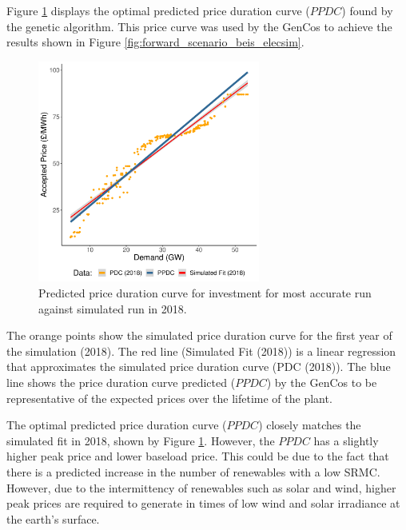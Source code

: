Figure \ref{fig:best_price_curve} displays the optimal predicted price duration curve ($PPDC$) found by the genetic algorithm. This price curve was used by the GenCos to achieve the results shown in Figure \ref{fig:forward_scenario_beis_elecsim}. 


\begin{figure}
	\centering
	\includegraphics[width=0.65\textwidth]{Chapter4/figures/e-Energy-2020/results/best_run_price_dur_curve.pdf}
	\caption{Predicted price duration curve for investment for most accurate run against simulated run in 2018.}
	\label{fig:best_price_curve}
\end{figure}

The orange points show the simulated price duration curve for the first year of the simulation (2018). The red line (Simulated Fit (2018)) is a linear regression that approximates the simulated price duration curve (PDC (2018)). The blue line shows the price duration curve predicted ($PPDC$) by the GenCos to be representative of the expected prices over the lifetime of the plant.


The optimal predicted price duration curve ($PPDC$) closely matches the simulated fit in 2018, shown by Figure \ref{fig:best_price_curve}. However, the $PPDC$ has a slightly higher peak price and lower baseload price. This could be due to the fact that there is a predicted increase in the number of renewables with a low SRMC. However, due to the intermittency of renewables such as solar and wind, higher peak prices are required to generate in times of low wind and solar irradiance at the earth's surface.






